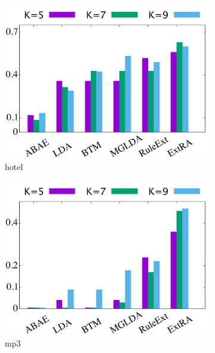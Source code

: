\begin{figure}[!ht]
	\centering
	\begin{subfigure}{.333\textwidth}
		\centering
		\includegraphics[width=0.99\linewidth]{figures/hotel_h}
		\caption{hotel}
		\label{fig:hotel_h}
	\end{subfigure}%
	\begin{subfigure}{.333\textwidth}
		\centering
		\includegraphics[width=0.99\linewidth]{figures/mp3_h}
		\caption{mp3}
		\label{fig:mp3_h}
	\end{subfigure}%
	\begin{subfigure}{.333\textwidth}
		\centering

\end{subfigure}
\end{figure}
